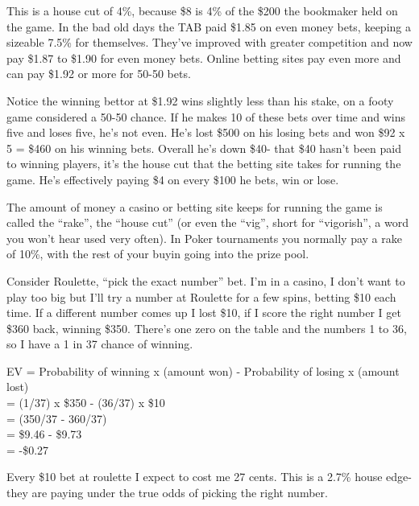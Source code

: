 This is a house cut of 4\%, because \$8 is 4\% of the \$200 the bookmaker
held on the game. In the bad old days
the TAB paid \$1.85 on even money bets, keeping a sizeable 7.5\% for
themselves. They've improved with greater competition and now pay \$1.87 to \$1.90 for
even money bets. Online betting sites pay even more and can pay
\$1.92 or more for 50-50 bets.


Notice the winning bettor at \$1.92 wins slightly less than his stake,
on a footy game considered a 50-50 chance. If he makes 10 of these
bets over time and wins five and loses five, he's not even. He's lost
\$500 on his losing bets and won \$92 x 5 = \$460 on his winning bets.
Overall he's down \$40- that \$40 hasn't been paid to winning players,
it's the house cut that the betting site takes for running the game.
He's effectively paying \$4 on every \$100 he bets, win or lose.

The amount of money a casino or betting site keeps for running the
game is called the ``rake'', the ``house cut'' (or even the ``vig'',
short for ``vigorish'', a word you won't hear used very often). 
In Poker tournaments you normally pay a rake of 10\%, with the rest of  
your buyin going into the prize pool.

Consider Roulette, ``pick the exact number'' bet. I'm in a casino,
I don't want to play too big but I'll try a number at Roulette for a few
spins, betting \$10 each time. If a different number comes up I lost \$10,
if I score the right number I get \$360 back, winning \$350. There's one
zero on the table and the numbers 1 to 36, so I have a 1 in 37 chance of
winning.

EV = Probability of winning x (amount won) - Probability of losing x (amount lost) \\
   = (1/37) x \$350 - (36/37) x \$10 \\
   = (350/37 - 360/37)  \\
   = \$9.46 - \$9.73 \\
   = -\$0.27

Every \$10 bet at roulette I expect to cost me 27 cents. This is a 2.7\% house
edge- they are paying under the true odds of picking the right number.


